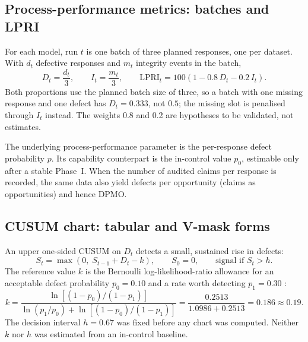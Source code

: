 \documentclass[11pt]{article}
\newcommand{\LPRI}{\mathrm{LPRI}}
\begin{document}
\subsection{Process-performance metrics: batches and LPRI}
For each model, run $t$ is one batch of three planned responses, one per dataset. With $d_t$ defective responses and $m_t$ integrity events in the batch,
\begin{equation}
D_t=\frac{d_t}{3},\qquad I_t=\frac{m_t}{3},\qquad \LPRI_t=100\left(1-0.8\,D_t-0.2\,I_t\right).
\label{eq:lpri}
\end{equation}
Both proportions use the planned batch size of three, so a batch with one missing response and one defect has $D_t=0.333$, not $0.5$; the missing slot is penalised through $I_t$ instead. The weights 0.8 and 0.2 are hypotheses to be validated, not estimates.

The underlying process-performance parameter is the per-response defect probability $p$. Its capability counterpart is the in-control value $p_0$, estimable only after a stable Phase~I. When the number of audited claims per response is recorded, the same data also yield defects per opportunity (claims as opportunities) and hence DPMO.

\subsection{CUSUM chart: tabular and V-mask forms}
An upper one-sided CUSUM on $D_t$ detects a small, sustained rise in defects:
\begin{equation}
S_t=\max\left(0,\;S_{t-1}+D_t-k\right),\qquad S_0=0,\qquad \text{signal if } S_t>h.
\label{eq:cusum}
\end{equation}
The reference value $k$ is the Bernoulli log-likelihood-ratio allowance for an acceptable defect probability $p_0=0.10$ and a rate worth detecting $p_1=0.30$ \citep{reynolds1999}:
\begin{equation}
k=\frac{\ln\!\left[(1-p_0)/(1-p_1)\right]}{\ln(p_1/p_0)+\ln\!\left[(1-p_0)/(1-p_1)\right]}
=\frac{0.2513}{1.0986+0.2513}=0.186\approx0.19.
\label{eq:k}
\end{equation}
The decision interval $h=0.67$ was fixed before any chart was computed. Neither $k$ nor $h$ was estimated from an in-control baseline.
\end{document}
